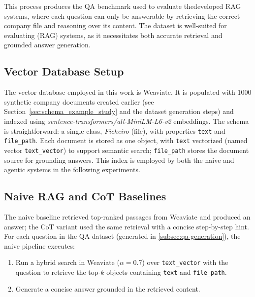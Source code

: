 This process produces the \gls{QA} benchmark used to evaluate thedeveloped \gls{RAG} systems, where each question can only be answerable by retrieving the correct company file and reasoning over its content. The dataset is well-suited for evaluating (\gls{RAG}) systems, as it necessitates both accurate retrieval and grounded answer generation.

\subsection{Vector Database Setup}
The vector database employed in this work is Weaviate. It is populated with 1000 synthetic company documents created earlier (see Section~\ref{sec:schema_example_study} and the dataset generation steps) and indexed using \textit{sentence-transformers/all-MiniLM-L6-v2} embeddings. The schema is straightforward: a single class, \textit{Ficheiro} (file), with properties \texttt{text} and \texttt{file\_path}. Each document is stored as one object, with \texttt{text} vectorized (named vector \texttt{text\_vector}) to support semantic search; \texttt{file\_path} stores the document source for grounding answers. This index is employed by both the naive and agentic systems in the following experiments.

\subsection{Naive RAG and CoT Baselines}
\label{sec:naive-rag-and-cot-baseline}
The naive baseline retrieved top-ranked passages from Weaviate and produced an answer; the CoT variant used the same retrieval with a concise step-by-step hint.
For each question in the \gls{QA} dataset (generated in \ref{subsec:qa-generation}), the naive pipeline executes:
\begin{enumerate}
    \item Run a hybrid search in Weaviate (\(\alpha = 0.7\)) over \texttt{text\_vector} with the question to retrieve the top-$k$ objects containing \texttt{text} and \texttt{file\_path}.
    \item Generate a concise answer grounded in the retrieved content.
\end{enumerate}


